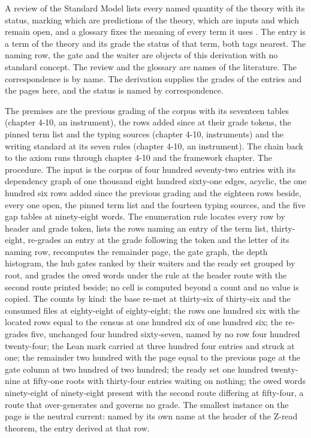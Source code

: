 \begin{chbridge}
A review of the Standard Model lists every named quantity of the theory with its status, marking which are predictions of the theory, which are inputs and which remain open, and a glossary fixes the meaning of every term it uses \cite{Weinberg1995,Peskin1995}.
The entry is a term of the theory and its grade the status of that term, both tags nearest. The naming row, the gate and the waiter are objects of this derivation with no standard concept. The review and the glossary are names of the literature. The correspondence is by name. The derivation supplies the grades of the entries and the pages here, and the status is named by correspondence.
\end{chbridge}
\begin{chproof}[instrument]
The premises are the previous grading of the corpus with its seventeen tables (chapter 4-10, an instrument), the rows added since at their grade tokens, the pinned term list and the typing sources (chapter 4-10, instruments) and the writing standard at its seven rules (chapter 4-10, an instrument). The chain back to the axiom runs through chapter 4-10 and the framework chapter. The procedure. The input is the corpus of four hundred seventy-two entries with its dependency graph of one thousand eight hundred sixty-one edges, acyclic, the one hundred six rows added since the previous grading and the eighteen rows beside, every one open, the pinned term list and the fourteen typing sources, and the five gap tables at ninety-eight words. The enumeration rule locates every row by header and grade token, lists the rows naming an entry of the term list, thirty-eight, re-grades an entry at the grade following the token and the letter of its naming row, recomputes the remainder page, the gate graph, the depth histogram, the hub gates ranked by their waiters and the ready set grouped by root, and grades the owed words under the rule at the header route with the second route printed beside; no cell is computed beyond a count and no value is copied. The counts by kind: the base re-met at thirty-six of thirty-six and the consumed files at eighty-eight of eighty-eight; the rows one hundred six with the located rows equal to the census at one hundred six of one hundred six; the re-grades five, unchanged four hundred sixty-seven, named by no row four hundred twenty-four; the Lean mark carried at three hundred four entries and struck at one; the remainder two hundred with the page equal to the previous page at the gate column at two hundred of two hundred; the ready set one hundred twenty-nine at fifty-one roots with thirty-four entries waiting on nothing; the owed words ninety-eight of ninety-eight present with the second route differing at fifty-four, a route that over-generates and governs no grade. The smallest instance on the page is the neutral current: named by its own name at the header of the Z-read theorem, the entry derived at that row.


\end{chproof}
